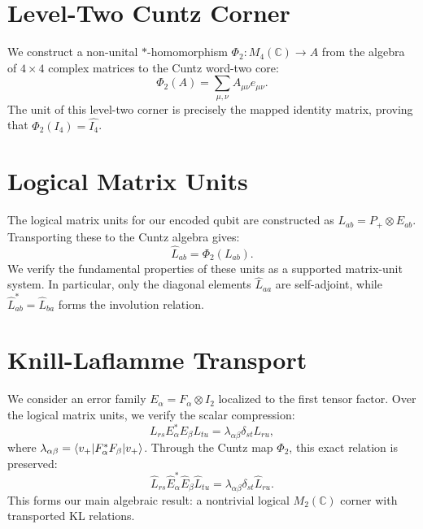 \documentclass[11pt,a4paper]{article}
\begin{document}
\section{Level-Two Cuntz Corner}
We construct a non-unital $*$-homomorphism $\Phi_2 : M_4(\mathbb{C}) \to A$ from the algebra of $4 \times 4$ complex matrices to the Cuntz word-two core:
\begin{equation}
\Phi_2(A) = \sum_{\mu,\nu} A_{\mu\nu} e_{\mu\nu}.
\end{equation}
The unit of this level-two corner is precisely the mapped identity matrix, proving that $\Phi_2(I_4) = \widehat{I_4}$.

\section{Logical Matrix Units}
The logical matrix units for our encoded qubit are constructed as $L_{ab} = P_+ \otimes E_{ab}$. Transporting these to the Cuntz algebra gives:
\begin{equation}
\widehat{L}_{ab} = \Phi_2(L_{ab}).
\end{equation}
We verify the fundamental properties of these units as a supported matrix-unit system. In particular, only the diagonal elements $\widehat{L}_{aa}$ are self-adjoint, while $\widehat{L}_{ab}^* = \widehat{L}_{ba}$ forms the involution relation.

\section{Knill-Laflamme Transport}
We consider an error family $E_\alpha = F_\alpha \otimes I_2$ localized to the first tensor factor. Over the logical matrix units, we verify the scalar compression:
\begin{equation}
L_{rs} E_\alpha^* E_\beta L_{tu} = \lambda_{\alpha\beta} \delta_{st} L_{ru},
\end{equation}
where $\lambda_{\alpha\beta} = \braket{v_+ | F_\alpha^* F_\beta | v_+}$. Through the Cuntz map $\Phi_2$, this exact relation is preserved:
\begin{equation}
\widehat{L}_{rs} \widehat{E}_\alpha^* \widehat{E}_\beta \widehat{L}_{tu} = \lambda_{\alpha\beta} \delta_{st} \widehat{L}_{ru}.
\end{equation}
This forms our main algebraic result: a nontrivial logical $M_2(\mathbb{C})$ corner with transported KL relations.
\end{document}
